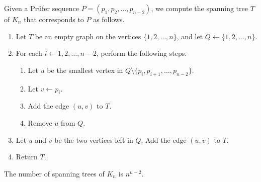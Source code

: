 \documentclass[11pt]{article}
\begin{document}
\begin{algorithm}[Decoding]
  Given a Pr\"ufer sequence $P = (p_1, p_2, \dots, p_{n-2})$, we compute the spanning tree $T$ of $K_n$ that corresponds to $P$ as follows.
  \begin{enumerate}[label=\arabic*.]
    \item Let $T$ be an empty graph on the vertices $\{1, 2, \dots, n\}$, and let $Q \gets \{1, 2, \dots, n\}$.
    \item For each $i \gets 1, 2, \dots, n-2$, perform the following steps.
    \begin{enumerate}[label*=\arabic*.]
      \item Let $u$ be the smallest vertex in $Q \setminus \{p_i, p_{i+1}, \dots, p_{n-2}\}$.
      \item Let $v \gets p_i$.
      \item Add the edge $(u, v)$ to $T$.
      \item Remove $u$ from $Q$.
    \end{enumerate}
    \item Let $u$ and $v$ be the two vertices left in $Q$.
    Add the edge $(u, v)$ to $T$.
    \item Return $T$.
  \end{enumerate}
\end{algorithm}

\begin{theorem}
  The number of spanning trees of $K_n$ is $n^{n-2}$.
\end{theorem}
\end{document}
